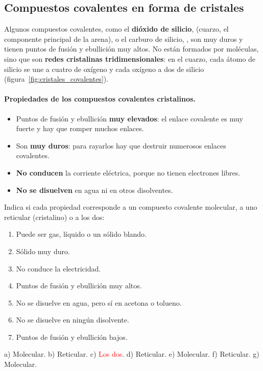 \subsection{Compuestos covalentes en forma de cristales}

Algunos compuestos covalentes, como el \textbf{dióxido de silicio},  (cuarzo, el componente principal de la arena), o el carburo de silicio, , son muy duros y tienen puntos de fusión y ebullición muy altos. No están formados por moléculas, sino que son \textbf{redes cristalinas tridimensionales}: en el cuarzo, cada átomo de silicio se une a cuatro de oxígeno y cada oxígeno a dos de silicio (figura~\ref{fig:cristales_covalentes}).

\paragraph{Propiedades de los compuestos covalentes cristalinos.}
\begin{itemize}
    \item Puntos de fusión y ebullición \textbf{muy elevados}: el enlace covalente es muy fuerte y hay que romper muchos enlaces.
    \item Son \textbf{muy duros}: para rayarlos hay que destruir numerosos enlaces covalentes.
    \item \textbf{No conducen} la corriente eléctrica, porque no tienen electrones libres.
    \item \textbf{No se disuelven} en agua ni en otros disolventes.
\end{itemize}

\begin{exercise}
    Indica si cada propiedad corresponde a un compuesto covalente molecular, a uno reticular (cristalino) o a los dos:
    \begin{enumerate}[label=\alph*)]
        \item Puede ser gas, líquido o un sólido blando.
        \item Sólido muy duro.
        \item No conduce la electricidad.
        \item Puntos de fusión y ebullición muy altos.
        \item No se disuelve en agua, pero sí en acetona o tolueno.
        \item No se disuelve en ningún disolvente.
        \item Puntos de fusión y ebullición bajos.
    \end{enumerate}
    \begin{solu}
        a) Molecular. b) Reticular. c) \textcolor{red}{Los dos}. d) Reticular. e) Molecular. f) Reticular. g) Molecular.
    \end{solu}
\end{exercise}

